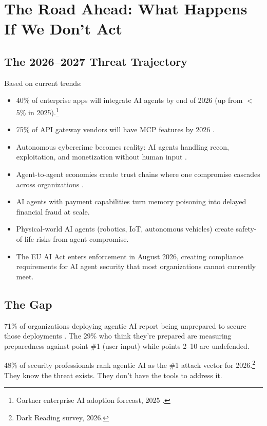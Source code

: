 \documentclass[11pt,letterpaper]{article}
\begin{document}
\section{The Road Ahead: What Happens If We Don't Act}
\label{sec:roadahead}

\subsection{The 2026--2027 Threat Trajectory}

Based on current trends:

\begin{itemize}
\item 40\% of enterprise apps will integrate AI agents by end of 2026 (up from $<$5\% in 2025).\footnote{Gartner enterprise AI adoption forecast, 2025 \cite{gartner}.}
\item 75\% of API gateway vendors will have MCP features by 2026 \cite{gartner}.
\item Autonomous cybercrime becomes reality: AI agents handling recon, exploitation, and monetization without human input \cite{trendmicro}.
\item Agent-to-agent economies create trust chains where one compromise cascades across organizations \cite{galileo}.
\item AI agents with payment capabilities turn memory poisoning into delayed financial fraud at scale.
\item Physical-world AI agents (robotics, IoT, autonomous vehicles) create safety-of-life risks from agent compromise.
\item The EU AI Act enters enforcement in August 2026, creating compliance requirements for AI agent security that most organizations cannot currently meet.
\end{itemize}


\subsection{The Gap}

71\% of organizations deploying agentic AI report being unprepared to secure those deployments \cite{cisco}. The 29\% who think they're prepared are measuring preparedness against point \#1 (user input) while points 2--10 are undefended.

48\% of security professionals rank agentic AI as the \#1 attack vector for 2026.\footnote{Dark Reading survey, 2026.} They know the threat exists. They don't have the tools to address it.
\end{document}
